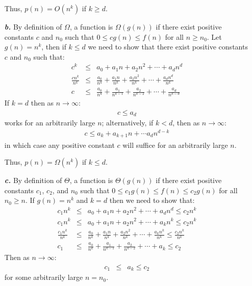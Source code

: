 \begin{enumerate}
		Thus, $p(n) = O(n^k)$ if $k \geq d$.
	\item[\textbf{\textit{b.}}] By definition of $\Omega$, a function is $\Omega(g(n))$ if there exist positive constants $c$ and $n_0$ such that $0 \leq c g(n) \leq f(n)$ for all $n \geq n_0$. Let $g(n) = n^k$, then if $k \leq d$ we need to show that there exist positive constants $c$ and $n_0$ such that:
		\begin{eqnarray*}
			c^k & \leq & a_0 + a_1 n + a_2 n^2 + \cdots + a_d n^d \\
			\frac{c n^k}{n^k} & \leq & \frac{a_0}{n^k} + \frac{a_1 n}{n^k} + \frac{a_2 n^2}{n^k} + \cdots + \frac{a_d n^d}{n^k} \\
			c & \leq & \frac{a_0}{n^k} + \frac{a_1}{n^{k-1}} + \frac{a_2}{n^{k-2}} + \cdots + \frac{a_d}{n^{k-d}}
		\end{eqnarray*}
		If $k = d$ then as $n \rightarrow \infty$:
		\begin{eqnarray*}
			c \leq a_d
		\end{eqnarray*}
		works for an arbitrarily large $n$; alternatively, if $k < d$, then as $n \rightarrow \infty$:
		\begin{eqnarray*}
			c \leq a_k + a_{k+1}n + \cdots a_d n^{d-k}
		\end{eqnarray*}
		in which case any positive constant $c$ will suffice for an arbitrarily large $n$.

		Thus, $p(n) = \Omega(n^k)$ if $k \leq d$.
	\item[\textbf{\textit{c.}}] By definition of $\Theta$, a function is $\Theta(g(n))$ if there exist positive constants $c_1$, $c_2$, and $n_0$ such that $0 \leq c_1 g(n) \leq f(n) \leq c_2 g(n)$ for all $n_0 \geq n$. If $g(n) = n^k$ and $k = d$ then we need to show that:
		\begin{eqnarray*}
			c_1 n^k & \leq & a_0 + a_1 n + a_2 n^2 + \cdots + a_d n^d \leq c_2 n^k \\
			c_1 n^k & \leq & a_0 + a_1 n + a_2 n^2 + \cdots + a_k n^k \leq c_2 n^k \\
			\frac{c_1 n^k}{n^k} & \leq & \frac{a_0}{n^k} + \frac{a_1 n}{n^k} + \frac{a_2 n^2}{n^k} + \cdots + \frac{a_k n^k}{n^k} \leq \frac{c_2 n^k}{n^k} \\
			c_1 & \leq & \frac{a_0}{n^k} + \frac{a_1}{n^{k-1}} + \frac{a_2}{n^{k-2}} + \cdots + a_k \leq c_2
		\end{eqnarray*}
		Then as $n \rightarrow \infty$:
		\begin{eqnarray*}
			c_1 & \leq & a_k \leq c_2
		\end{eqnarray*}
		for some arbitrarily large $n = n_0$.


\end{enumerate}
